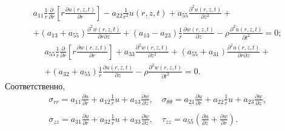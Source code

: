 \begin{multline*}
a_{11} \frac{1}{r}\frac{\partial }{\partial r}\left[ {r\frac{\partial 
u\left( {r,z,t} \right)}{\partial r}} \right] - a_{22} \frac{1}{r^2}u\left( 
{r,z,t} \right) + a_{55} \frac{\partial ^2u\left( {r,z,t} \right)}{\partial 
z^2} + 
\\
 + \left( {a_{13} + a_{55} } \right)\frac{\partial ^2w\left( {r,z,t} 
\right)}{\partial r\partial z} + \left( {a_{13} - a_{23} } 
\right)\frac{1}{r}\frac{\partial w\left( {r,z,t} \right)}{\partial z} - \rho 
\frac{\partial ^2u\left( {r,z,t} \right)}{\partial t^2} = 0;
\end{multline*}
\begin{multline}
 \label{senic:eq4}
a_{55} \frac{1}{r}\frac{\partial }{\partial r}\left[ {r\frac{\partial 
w\left( {r,z,t} \right)}{\partial r}} \right] + a_{33} \frac{\partial 
^2w\left( {r,z,t} \right)}{\partial z^2} + \left( {a_{55} + a_{31} } 
\right)\frac{\partial ^2u\left( {r,z,t} \right)}{\partial r\partial z} + 
\\
+ \left( {a_{32} + a_{55} } \right)\frac{1}{r}\frac{\partial u\left( 
{r,z,t} \right)}{\partial z} - \rho \frac{\partial ^2w\left( {r,z,t} 
\right)}{\partial t^2} = 0.
\end{multline}
Соответственно, 
\begin{equation}
\label{senic:eq5}
 \begin{array}{l}
\displaystyle
\sigma _{rr} = a_{11} \frac{\partial u}{\partial r} + a_{12} \frac{1}{r}u + 
a_{13} \frac{\partial w}{\partial z},
\quad
\sigma _{\theta \theta } = a_{21} 
\frac{\partial u}{\partial r} + a_{22} \frac{1}{r}u + a_{23} \frac{\partial 
w}{\partial z},
\\\displaystyle
\sigma _{zz} = a_{31} \frac{\partial u}{\partial r} + a_{32} \frac{1}{r}u + 
a_{33} \frac{\partial w}{\partial z},
\quad 
\tau _{zz} = a_{55} \left( 
{\frac{\partial u}{\partial z} + \frac{\partial w}{\partial r}} \right).{\phantom{\int\limits^1}}
\end{array}
\end{equation}


